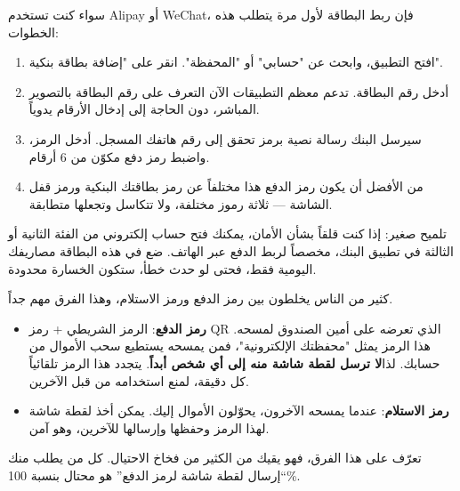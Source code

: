 


سواء كنت تستخدم Alipay أو WeChat، فإن ربط البطاقة لأول مرة يتطلب هذه الخطوات:

\begin{enumerate}
  \item افتح التطبيق، وابحث عن "حسابي" أو "المحفظة". انقر على "إضافة بطاقة بنكية".
  \item أدخل رقم البطاقة. تدعم معظم التطبيقات الآن التعرف على رقم البطاقة بالتصوير المباشر، دون الحاجة إلى إدخال الأرقام يدوياً.
  \item سيرسل البنك رسالة نصية برمز تحقق إلى رقم هاتفك المسجل. أدخل الرمز، واضبط رمز دفع مكوّن من 6 أرقام.
  \item من الأفضل أن يكون رمز الدفع هذا مختلفاً عن رمز بطاقتك البنكية ورمز قفل الشاشة — ثلاثة رموز مختلفة، ولا تتكاسل وتجعلها متطابقة.
\end{enumerate}

تلميح صغير: إذا كنت قلقاً بشأن الأمان، يمكنك فتح حساب إلكتروني من الفئة الثانية أو الثالثة في تطبيق البنك، مخصصاً لربط الدفع عبر الهاتف. ضع في هذه البطاقة مصاريفك اليومية فقط، فحتى لو حدث خطأ، ستكون الخسارة محدودة.


كثير من الناس يخلطون بين رمز الدفع ورمز الاستلام، وهذا الفرق مهم جداً.

\begin{itemize}
  \item \textbf{رمز الدفع}: الرمز الشريطي + رمز QR الذي تعرضه على أمين الصندوق لمسحه. هذا الرمز يمثل "محفظتك الإلكترونية"، فمن يمسحه يستطيع سحب الأموال من حسابك. لذا\textbf{لا ترسل لقطة شاشة منه إلى أي شخص أبداً}. يتجدد هذا الرمز تلقائياً كل دقيقة، لمنع استخدامه من قبل الآخرين.
  \item \textbf{رمز الاستلام}: عندما يمسحه الآخرون، يحوّلون الأموال إليك. يمكن أخذ لقطة شاشة لهذا الرمز وحفظها وإرسالها للآخرين، وهو آمن.
\end{itemize}

تعرّف على هذا الفرق، فهو يقيك من الكثير من فخاخ الاحتيال. كل من يطلب منك “إرسال لقطة شاشة لرمز الدفع” هو محتال بنسبة 100\%.

